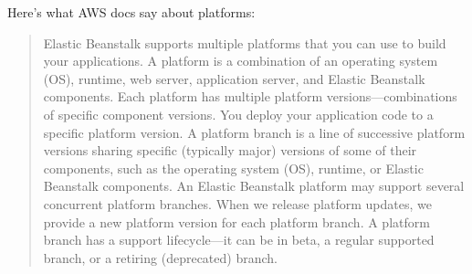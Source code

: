 \documentclass{article}%
\begin{document}
\noindent Here's what AWS docs say about platforms: 
\begin{quote}
Elastic Beanstalk supports multiple platforms that you can use to build your applications. A platform is a combination of an operating system (OS), runtime, web server, application server, and Elastic Beanstalk components. Each platform has multiple platform versions—combinations of specific component versions. You deploy your application code to a specific platform version.
A platform branch is a line of successive platform versions sharing specific (typically major) versions of some of their components, such as the operating system (OS), runtime, or Elastic Beanstalk components. An Elastic Beanstalk platform may support several concurrent platform branches. When we release platform updates, we provide a new platform version for each platform branch. A platform branch has a support lifecycle—it can be in beta, a regular supported branch, or a retiring (deprecated) branch.
\end{quote}
\end{document}

